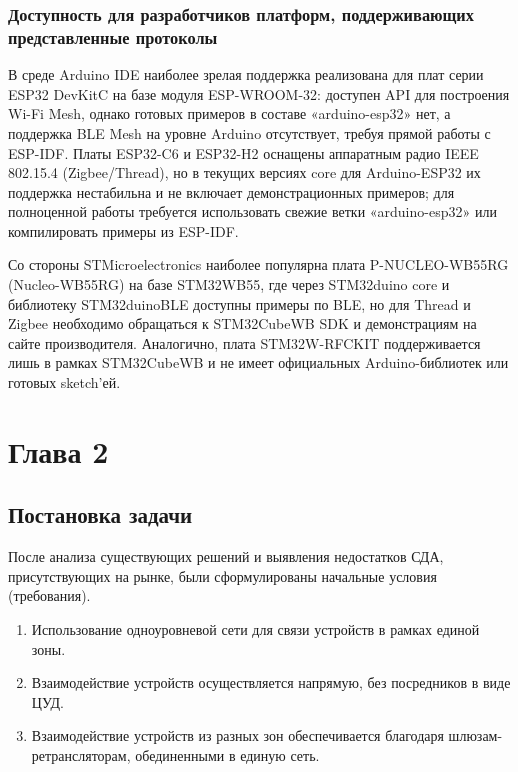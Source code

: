 \documentclass[a4paper,12pt]{article}
\begin{document}
\subsubsection{Доступность для разработчиков платформ, поддерживающих представленные протоколы}

В среде Arduino IDE наиболее зрелая поддержка реализована для плат серии ESP32 DevKitC на базе модуля ESP-WROOM-32: доступен API для построения Wi-Fi Mesh,
однако готовых примеров в составе «arduino-esp32» нет, а поддержка BLE Mesh на уровне Arduino отсутствует, требуя прямой работы с ESP-IDF. Платы ESP32-C6 и
ESP32-H2 оснащены аппаратным радио IEEE 802.15.4 (Zigbee/Thread), но в текущих версиях core для Arduino-ESP32 их поддержка нестабильна и не включает
демонстрационных примеров; для полноценной работы требуется использовать свежие ветки «arduino-esp32» или компилировать примеры из ESP-IDF.

Со стороны STMicroelectronics наиболее популярна плата P-NUCLEO-WB55RG (Nucleo-WB55RG) на базе STM32WB55, где через STM32duino core и библиотеку STM32duinoBLE
доступны примеры по BLE, но для Thread и Zigbee необходимо обращаться к STM32CubeWB SDK и демонстрациям на сайте производителя. Аналогично, плата STM32W-RFCKIT
поддерживается лишь в рамках STM32CubeWB и не имеет официальных Arduino-библиотек или готовых sketch’ей.

\newpage

\section{Глава 2}

\subsection{Постановка задачи}
После анализа существующих решений и выявления недостатков СДА, присутствующих на рынке, были сформулированы начальные
условия (требования).

\begin{enumerate}
    \item Использование одноуровневой сети для связи устройств в рамках единой зоны.
    \item Взаимодействие устройств осуществляется напрямую, без посредников в виде ЦУД.
    \item Взаимодействие устройств из разных зон обеспечивается благодаря шлюзам-ретрансляторам, обединенными в единую сеть.
\end{enumerate}
\end{document}
